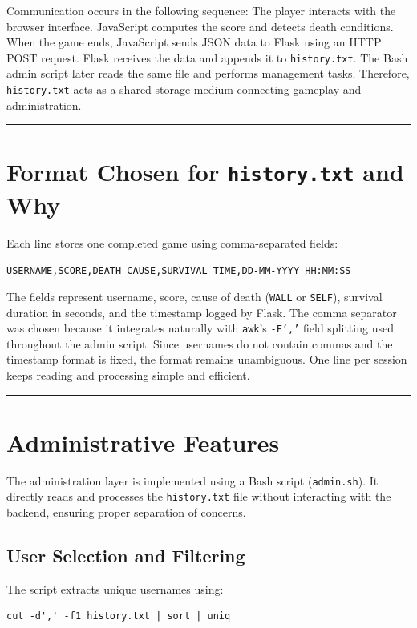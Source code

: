 \documentclass[12pt,a4paper]{article}
\newcommand{\sectionsep}{
    \vspace{1.5em}
    \noindent\rule{\textwidth}{0.8pt}
    \vspace{1.5em}
}
\begin{document}
Communication occurs in the following sequence:
The player interacts with the browser interface. JavaScript computes the score and detects death conditions. When the game ends, JavaScript sends JSON data to Flask using an HTTP POST request. Flask receives the data and appends it to \texttt{history.txt}. The Bash admin script later reads the same file and performs management tasks. Therefore, \texttt{history.txt} acts as a shared storage medium connecting gameplay and administration.

\sectionsep

\section{Format Chosen for \texttt{history.txt} and Why}

Each line stores one completed game using comma-separated fields:
\begin{center}
\texttt{USERNAME,SCORE,DEATH\_CAUSE,SURVIVAL\_TIME,DD-MM-YYYY HH:MM:SS}
\end{center}

The fields represent username, score, cause of death (\texttt{WALL} or \texttt{SELF}), survival duration in seconds, and the timestamp logged by Flask. The comma separator was chosen because it integrates naturally with \texttt{awk}'s \texttt{-F','} field splitting used throughout the admin script. Since usernames do not contain commas and the timestamp format is fixed, the format remains unambiguous. One line per session keeps reading and processing simple and efficient.

\sectionsep

\section{Administrative Features}

The administration layer is implemented using a Bash script (\texttt{admin.sh}). It directly reads and processes the \texttt{history.txt} file without interacting with the backend, ensuring proper separation of concerns.

\subsection{User Selection and Filtering}

The script extracts unique usernames using:

\begin{lstlisting}
cut -d',' -f1 history.txt | sort | uniq
\end{lstlisting}
\end{document}

